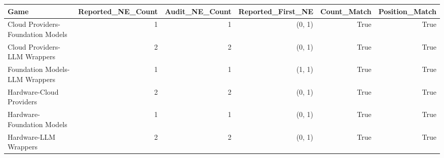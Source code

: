 

\begin{tabular}{@{}lrrrrr@{}}
\toprule
Game & Reported\_NE\_Count & Audit\_NE\_Count & Reported\_First\_NE & Count\_Match & Position\_Match \\
\midrule
Cloud Providers-Foundation Models & 1 & 1 & (0, 1) & True & True \\
Cloud Providers-LLM Wrappers & 2 & 2 & (0, 1) & True & True \\
Foundation Models-LLM Wrappers & 1 & 1 & (1, 1) & True & True \\
Hardware-Cloud Providers & 2 & 2 & (0, 1) & True & True \\
Hardware-Foundation Models & 1 & 1 & (0, 1) & True & True \\
Hardware-LLM Wrappers & 2 & 2 & (0, 1) & True & True \\
\bottomrule
\end{tabular}